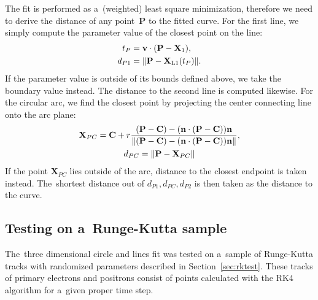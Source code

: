 			The fit is performed as a~(weighted) least square minimization, therefore we need to derive the distance of any point~$\mathbf{P}$ to the fitted curve. For the first line, we simply compute the parameter value of the closest point on the line:
				\begin{equation}
					\label{eq:segdist}
					\begin{aligned}
						t_P &= \mathbf{v}\cdot(\mathbf{P}-\mathbf{X}_1),\\
						d_{P1} &= \norm{\mathbf{P}-\mathbf{X}_\text{L1}(t_P)}.
					\end{aligned}
				\end{equation}
			If the parameter value is outside of its bounds defined above, we take the boundary value instead. The distance to the second line is computed likewise. For the circular arc, we find the closest point by projecting the center connecting line onto the arc plane:
				\begin{gather}
					\mathbf{X}_{PC} = \mathbf{C} + r\frac{(\mathbf{P}-\mathbf{C})-(\mathbf{n}\cdot(\mathbf{P}-\mathbf{C}))\mathbf{n}}{\norm{(\mathbf{P}-\mathbf{C})-(\mathbf{n}\cdot(\mathbf{P}-\mathbf{C}))\mathbf{n}}},\\
					d_{PC} = \norm{\mathbf{P}-\mathbf{X}_{PC}}
				\end{gather}
			 If the point $\mathbf{X}_{PC}$ lies outside of the arc, distance to the closest endpoint is taken instead. The~shortest distance out of $d_{P1},d_{PC},d_{P2}$ is then taken as the distance to the curve.
			
			
			\subsection{Testing on a~Runge-Kutta sample}
				The~three dimensional circle and lines fit was tested on a~sample of Runge-Kutta tracks with randomized parameters described in Section~\ref{sec:rktest}. These tracks of primary electrons and positrons consist of points calculated with the \ac{RK4} algorithm for a~given proper time step.
	

